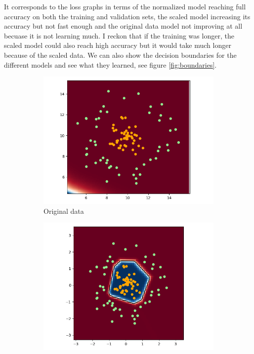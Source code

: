 \documentclass[a4paper,11pt]{article}
\begin{document}
It corresponds to the loss graphs in terms of the normalized model reaching full accuracy on both the training and validation sets, the scaled model increasing its accuracy but not fast enough and the original data model not improving at all becuase it is not learning much.
I reckon that if the training was longer, the scaled model could also reach high accuracy but it would take much longer because of the scaled data.
We can also show the decision boundaries for the different models and see what they learned, see figure \ref{fig:boundaries}.

\begin{figure}[ht]
    \centering
    \hfill
    \begin{subfigure}[b]{0.3\textwidth}
        \includegraphics[width=\textwidth]{../out/02_shallow/original.png}
        \caption{Original data}
    \end{subfigure}
    \hfill
    \begin{subfigure}[b]{0.3\textwidth}
        \includegraphics[width=\textwidth]{../out/02_shallow/norm.png}

\end{subfigure}
\end{figure}
\end{document}
